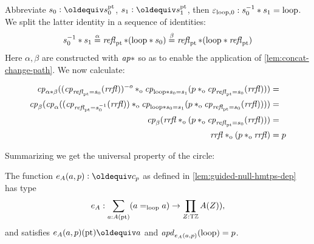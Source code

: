 \documentclass[a4,12pt]{amsart}
\begin{document}
Abbreviate $s_0 \defeq s^\pt_0$, $s_1 \defeq s^\pt_1$, 
then $\varepsilon_{\Zloop,0} : s_0^{-1} \ct s_1 = \Zloop$.
We split the latter identity in a sequence of identities:
\[
s_0^{-1} \ct s_1 \stackrel{\alpha}{=} 
\refl{\pt}\ct(\Zloop\ct s_0) \stackrel{\beta}{=} 
\refl{\pt}\ct(\Zloop\ct\refl{\pt}) 
\]
Here $\alpha,\beta$ are constructed with $\apc$ so as to
enable the application of \cref{lem:concat-change-path}.
We now calculate:

\begin{align*}
\cp{\alpha\ct\beta}
((\cp{\refl{\pt} = s_0}(\rrfl))^{-o} \cto
   \cp{\Zloop\ct s_0 = s_1}(p\cto\cp{\refl{\pt} = s_0}(\rrfl)))&= \\
\cp{\beta}(\cp{\alpha}
((\cp{\refl{\pt} = s_0^{-1}}(\rrfl)) \cto
   \cp{\Zloop\ct s_0 = s_1}(p\cto\cp{\refl{\pt} = s_0}(\rrfl))))&= \\
\cp{\beta}
(\rrfl \cto
   (p\cto\cp{\refl{\pt} = s_0}(\rrfl)))&= \\
\rrfl\cto(p\cto\rrfl)&=p\\
\end{align*}

Summarizing we get the universal property of the circle:

\begin{definition}\label{def:TorZelim}
The function $e_A(a,p) \defeq c_p$ as defined in 
\cref{lem:guided-null-hmtps-dep} has type
\[
e_A : \sum_{a:A(\pt)}(a=_\Zloop a) \to \prod_{Z:\TorZ} A(Z)),
\]
and satisfies $e_A(a,p)(\pt) \jdeq a$ and 
$\apd{e_A(a,p)}(\Zloop) = p$.
\end{definition}





\end{document}

